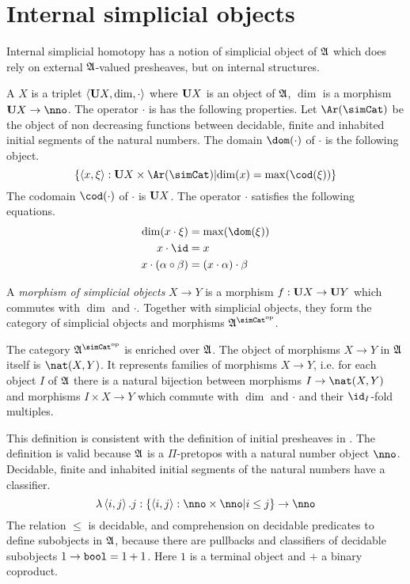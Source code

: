 \documentclass[csh.tex]{subfiles}
\begin{document}
\section{Internal simplicial objects}
Internal simplicial homotopy has a notion of simplicial object of $\mathfrak A$ which does rely on external $\mathfrak A$-valued presheaves, but on internal structures.

\begin{definition} A  $X$ is a triplet $\left\langle \mathbf{U} X, \dim, \cdot \right\rangle$ where $\mathbf{U} X$ is an object of $\mathfrak A$, $\dim$ is a morphism $\base X\to \nno$. The operator $\cdot$ is has the following properties. Let $\Ar(\simCat)$ be the object of non decreasing functions between decidable, finite and inhabited initial segments of the natural numbers. The domain $\dom(\cdot)$ of $\cdot$ is the following object. 
\[ \set{\tuplet{x,\xi}\of \base X\times \Ar(\simCat)\middle| \dim(x) = \max(\cod(\xi))}\]
The codomain $\cod(\cdot)$ of $\cdot$ is $\mathbf{U} X$. The operator $\cdot$ satisfies the following equations.
\begin{align*}
\dim(x\cdot\xi) &= \max(\dom(\xi))\\
x\cdot \id &= x \\
x\cdot(\alpha\circ\beta)&=(x\cdot\alpha)\cdot\beta 
\end{align*}

A \emph{morphism of simplicial objects} $X\to Y$ is a morphism $f:\mathbf{U} X\to\mathbf{U} Y$ which commutes with $\dim$ and $\cdot$. Together with simplicial objects, they form the category of simplicial objects and morphisms $\ambient\s$.

The category $\ambient\s$ is enriched over $\mathfrak A$. The object of morphisms $X\to Y$ in $\mathfrak A$ itself is $\nat(X,Y)$. It represents families of morphisms $X\to Y$, i.e. for each object $I$ of $\mathfrak A$ there is a natural bijection between morphisms $I\to \nat(X,Y)$ and morphisms $I\times X\to Y$ which commute with $\dim$ and $\cdot$ and their $\id_I$-fold multiples.
\end{definition}

This definition is consistent with the definition of initial presheaves in \citep{MR1300636}. The definition is valid because $\mathfrak A$ is a $\Pi$-pretopos with a natural number object $\nno$. Decidable, finite and inhabited initial segments of the natural numbers have a classifier.
\[  \lambda\tuplet{i,j}.j\of\set{\tuplet{i,j}\of\nno\times\nno\middle|i\leq j}\to \nno \]
The relation $\leq$ is decidable, and comprehension on decidable predicates to define subobjects in $\mathfrak A$, because there are pullbacks and classifiers of decidable subobjects $1\to \mathtt{bool} = 1+1$. Here $1$ is a terminal object and $+$ a binary coproduct.
\end{document}
